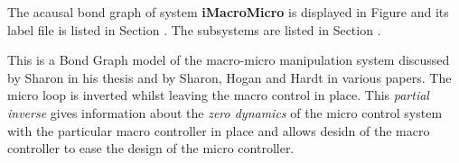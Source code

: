 

   The acausal bond graph of system \textbf{iMacroMicro} is
   displayed in Figure  and its label
   file is listed in Section .
   The subsystems are listed in Section .

This is a Bond Graph model of the macro-micro manipulation system
discussed by Sharon in his thesis and by Sharon, Hogan and Hardt in
various papers. The micro loop is inverted whilst leaving the macro
control in place. This {\em partial inverse\/} gives information about
the {\em zero dynamics\/} of the micro control system with the
particular macro controller in place and allows desidn of the macro
controller to ease the design of the micro controller.


